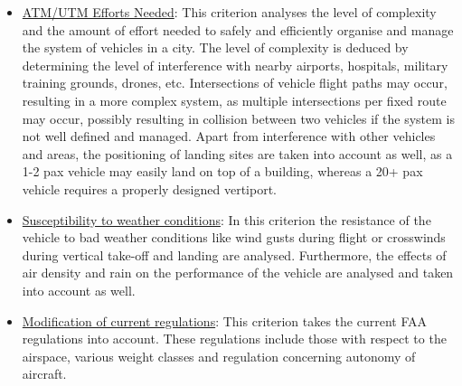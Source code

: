 \begin{itemize}
    \item \underline{ATM/UTM Efforts Needed}: This criterion analyses the level of complexity and the amount of effort needed to safely and efficiently organise and manage the system of vehicles in a city. The level of complexity is deduced by determining the level of interference with nearby airports, hospitals, military training grounds, drones, etc. Intersections of vehicle flight paths may occur, resulting in a more complex system,  as multiple intersections per fixed route may occur, possibly resulting in collision between two vehicles if the system is not well defined and managed. Apart from interference with other vehicles and areas, the positioning of landing sites are taken into account as well, as a 1-2 pax vehicle may easily land on top of a building, whereas a 20+ pax vehicle requires a properly designed vertiport.
    \item \underline{Susceptibility to weather conditions}: In this criterion the resistance of the vehicle to bad weather conditions like wind gusts during flight or crosswinds during vertical take-off and landing are analysed. Furthermore, the effects of air density and rain on the performance of the vehicle are analysed and taken into account as well. 
    \item \underline{Modification of current regulations}: This criterion takes the current FAA regulations into account. These regulations include those with respect to the airspace, various weight classes and regulation concerning autonomy of aircraft. 

  
\end{itemize}


    
  








    
